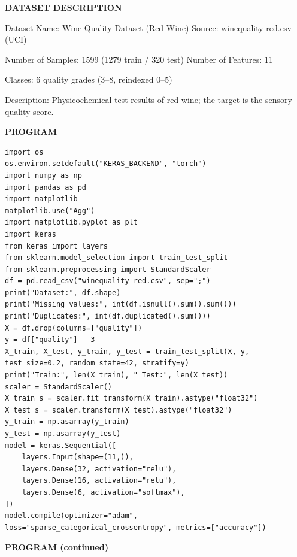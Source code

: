 \documentclass[11pt,twoside]{article}
\newcommand{\expheading}[1]{{\fontsize{14}{17}\selectfont\textbf{#1}\par}}
\newcommand{\toevenpage}{\clearpage\ifodd\value{page}\null\thispagestyle{empty}\newpage\fi}
\begin{document}
{\expheading{DATASET DESCRIPTION}
\vspace{4pt}
\noindent Dataset Name: Wine Quality Dataset (Red Wine) \hspace{0.3cm} Source: winequality-red.csv (UCI)\par
\noindent Number of Samples: 1599 (1279 train / 320 test) \hspace{0.3cm} Number of Features: 11\par
\noindent Classes: 6 quality grades (3--8, reindexed 0--5)\par
\noindent Description: Physicochemical test results of red wine; the target is the sensory quality score. \par
\vspace{4pt}
} %
\toevenpage
\expheading{PROGRAM}
\vspace{6pt}

\begin{lstlisting}
import os
os.environ.setdefault("KERAS_BACKEND", "torch")
import numpy as np
import pandas as pd
import matplotlib
matplotlib.use("Agg")
import matplotlib.pyplot as plt
import keras
from keras import layers
from sklearn.model_selection import train_test_split
from sklearn.preprocessing import StandardScaler
df = pd.read_csv("winequality-red.csv", sep=";")
print("Dataset:", df.shape)
print("Missing values:", int(df.isnull().sum().sum()))
print("Duplicates:", int(df.duplicated().sum()))
X = df.drop(columns=["quality"])
y = df["quality"] - 3
X_train, X_test, y_train, y_test = train_test_split(X, y, test_size=0.2, random_state=42, stratify=y)
print("Train:", len(X_train), " Test:", len(X_test))
scaler = StandardScaler()
X_train_s = scaler.fit_transform(X_train).astype("float32")
X_test_s = scaler.transform(X_test).astype("float32")
y_train = np.asarray(y_train)
y_test = np.asarray(y_test)
model = keras.Sequential([
    layers.Input(shape=(11,)),
    layers.Dense(32, activation="relu"),
    layers.Dense(16, activation="relu"),
    layers.Dense(6, activation="softmax"),
])
model.compile(optimizer="adam", loss="sparse_categorical_crossentropy", metrics=["accuracy"])
\end{lstlisting}

\toevenpage
\expheading{PROGRAM (continued)}
\vspace{6pt}
\end{document}

